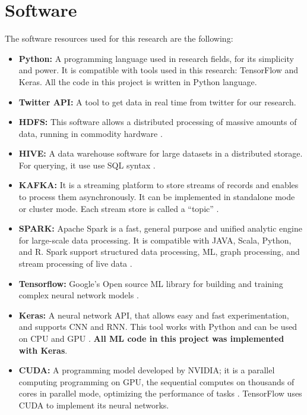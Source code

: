 \documentclass[12pt]{report}
\begin{document}
\section{Software}
The software resources used for this research are the following: 
\begin{itemize}[nolistsep]
	\item \textbf{Python:} A programming language  used in research fields, for its simplicity and power. It is compatible with tools used in this research: TensorFlow and Keras. All the code in this project is written in Python language.
	
	\item \textbf{Twitter \ac{API}:} A tool to  get data in real time from twitter for our research. 
	
	\item \textbf{\ac{HDFS}:} This software allows a distributed processing of  massive amounts of data, running in commodity hardware \cite{Hadoop2019}.
	
	\item \textbf{HIVE:} A data warehouse software for large datasets in a distributed storage. For querying, it use use \ac{SQL} syntax \cite{Hive2019}.
	
	\item \textbf{KAFKA:} It is a streaming platform to store streams of records and enables to process them asynchronously. It can be implemented in standalone mode or cluster mode. Each stream store is called a ``topic'' \cite{Kafka2019}.
	
	\item \textbf{SPARK:} Apache Spark is a fast, general purpose and unified analytic engine for large-scale data processing. It is compatible with JAVA, Scala, Python, and R. Spark support structured data processing, \ac{ML}, graph processing, and stream processing of live data \cite{Spark2019}.
	
	\item \textbf{Tensorflow:} Google's Open source \ac{ML} library for building and training complex neural network models \cite{Tensor2019}.
	
	\item \textbf{Keras:} A neural network \ac{API}, that allows easy and fast experimentation, and supports \ac{CNN} and \ac{RNN}. This tool works with Python and can be used on \ac{CPU} and \ac{GPU} \cite{Keras2019}. {\bf All \ac{ML} code in this project was implemented with Keras}.
	
	\item \textbf{\ac{CUDA}:} A programming model developed by NVIDIA; it is a parallel computing programming on \ac{GPU}, the sequential computes on thousands of cores in parallel mode, optimizing the performance of tasks \cite{Cuda2019}. TensorFlow uses CUDA to implement its neural networks. 
	

\end{itemize}
\end{document}

